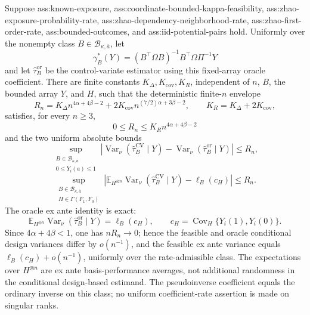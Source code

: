 Suppose ass:known-exposure, ass:coordinate-bounded-kappa-feasibility, ass:zhao-exposure-probability-rate, ass:zhao-dependency-neighborhood-rate, ass:zhao-first-order-rate, ass:bounded-outcomes, and ass:iid-potential-pairs hold.  Uniformly over the nonempty class \(B\in\mathcal B_{\kappa,\overline a}\), let
\[
\gamma_B^*(Y)=(B^{\top}\Omega B)^{-1}B^{\top}\Omega\Pi^{-1}Y
\]
and let \(\widehat\tau_B^{\mathrm{or}}\) be the control-variate estimator using this fixed-array oracle coefficient.  There are finite constants \(K_\Delta,K_{\mathrm{cov}},K_R\), independent of \(n\), \(B\), the bounded array \(Y\), and \(H\), such that the deterministic finite-\(n\) envelope
\[
R_n=K_\Delta n^{4\alpha+4\beta-2}
+2K_{\mathrm{cov}}n^{(7/2)\alpha+3\beta-2},
\qquad K_R=K_\Delta+2K_{\mathrm{cov}},
\]
satisfies, for every \(n\ge3\),
\[
0\le R_n\le K_Rn^{4\alpha+4\beta-2}
\]
and the two uniform absolute bounds
\[
\sup_{\substack{B\in\mathcal B_{\kappa,\overline a}\\0\le Y_i(a)\le1}}
\left|
\operatorname{Var}_\nu(\widehat\tau_B^{\mathrm{CV}}\mid Y)
-\operatorname{Var}_\nu(\widehat\tau_B^{\mathrm{or}}\mid Y)
\right|
\le R_n,
\]
\[
\sup_{\substack{B\in\mathcal B_{\kappa,\overline a}\\H\in\Gamma(F_1,F_0)}}
\left|
\mathbb E_{H^{\otimes n}}
\operatorname{Var}_\nu(\widehat\tau_B^{\mathrm{CV}}\mid Y)
-\ell_B(c_H)
\right|
\le R_n.
\]
The oracle ex ante identity is exact:
\[
\mathbb E_{H^{\otimes n}}
\operatorname{Var}_\nu(\widehat\tau_B^{\mathrm{or}}\mid Y)
=\ell_B(c_H),
\qquad
c_H=\operatorname{Cov}_H\{Y_i(1),Y_i(0)\}.
\]
Since \(4\alpha+4\beta<1\), one has \(nR_n\to0\); hence the feasible and oracle conditional design variances differ by \(o(n^{-1})\), and the feasible ex ante variance equals \(\ell_B(c_H)+o(n^{-1})\), uniformly over the rate-admissible class.  The expectations over \(H^{\otimes n}\) are ex ante basis-performance averages, not additional randomness in the conditional design-based estimand.  The pseudoinverse coefficient equals the ordinary inverse on this class; no uniform coefficient-rate assertion is made on singular ranks.